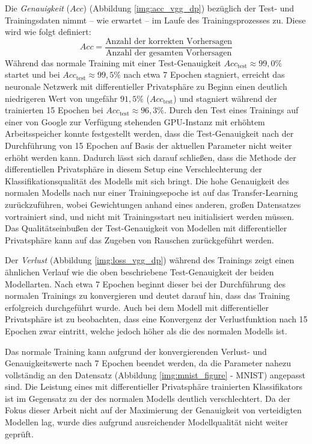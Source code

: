Die \textit{Genauigkeit} (\(Acc\)) (Abbildung \ref{img:acc_vgg_dp}) bezüglich der Test- und Trainingsdaten nimmt -- wie erwartet -- im Laufe des Trainingsprozesses zu. 
Diese wird wie folgt definiert: 
\begin{equation}
	Acc = \frac{\text{Anzahl der korrekten Vorhersagen}}{\text{Anzahl der gesamten Vorhersagen}}
\end{equation}
Während das \glqq normale Training\grqq{} mit einer Test-Genauigkeit \(Acc_{\text{test}}\)$\approx99{,}0\%$ startet und bei  \(Acc_{\text{test}}\)$\approx 99{,}5\%$ nach etwa 7 Epochen stagniert, erreicht das \glqq neuronale Netzwerk mit differentieller Privatsphäre\grqq{} zu Beginn einen deutlich niedrigeren Wert von ungefähr $91{,}5\%$ (\(Acc_{\text{test}}\)) und stagniert während der trainierten 15 Epochen bei \(Acc_{\text{test}}\)$\approx96{,}3\%$. Durch den Test eines Trainings auf einer von Google zur Verfügung stehenden GPU-Instanz mit erhöhtem Arbeitsspeicher konnte festgestellt werden, dass die Test-Genauigkeit nach der Durchführung von 15 Epochen auf Basis der aktuellen Parameter nicht weiter erhöht werden kann. Dadurch lässt sich darauf schließen, dass die Methode der differentiellen Privatsphäre in diesem Setup eine Verschlechterung der Klassifikationsqualität des Modells mit sich bringt. Die hohe Genauigkeit des \glqq normalen Modells\grqq{} nach nur einer Trainingsepoche ist auf das Transfer-Learning zurückzuführen, wobei Gewichtungen anhand eines anderen, großen Datensatzes vortrainiert sind, und nicht mit Trainingsstart neu initialisiert werden müssen. Das Qualitätseinbußen der Test-Genauigkeit von Modellen mit differentieller Privatsphäre kann auf das Zugeben von Rauschen zurückgeführt werden.

Der \textit{Verlust} (Abbildung \ref{img:loss_vgg_dp}) während des Trainings zeigt einen ähnlichen Verlauf wie die oben beschriebene Test-Genauigkeit der beiden Modellarten. Nach etwa 7 Epochen beginnt dieser bei der Durchführung des \glqq normalen Trainings\grqq{} zu konvergieren und deutet darauf hin, dass das Training erfolgreich durchgeführt wurde. Auch bei dem \glqq Modell mit differentieller Privatsphäre\grqq{} ist zu beobachten, dass eine Konvergenz der Verlustfunktion nach 15 Epochen zwar eintritt, welche jedoch höher als die des normalen Modells ist.

Das \glqq normale Training\grqq{} kann aufgrund der konvergierenden Verlust- und Genauigkeitswerte nach 7 Epochen beendet werden, da die Parameter nahezu vollständig an den Datensatz (Abbildung \ref{img:mnist_figure} - MNIST) angepasst sind. Die Leistung eines mit differentieller Privatsphäre trainierten Klassifikators ist im Gegensatz zu der des \glqq normalen\grqq{} Modells deutlich verschlechtert. Da der Fokus dieser Arbeit nicht auf der Maximierung der Genauigkeit von \glqq verteidigten Modellen\grqq{} lag, wurde dies aufgrund ausreichender Modellqualität nicht weiter geprüft.

